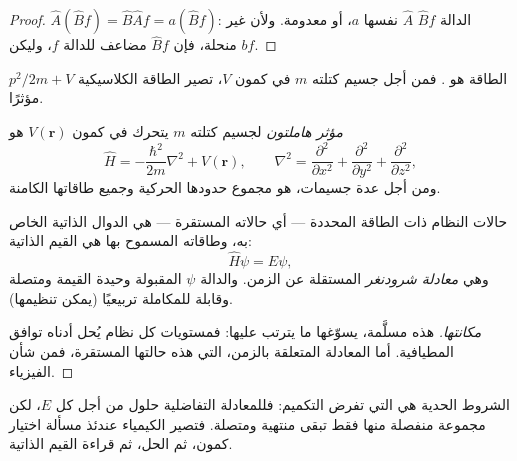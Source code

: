 \begin{proof}
$\hat A(\hat Bf) = \hat B\hat Af = a(\hat Bf)$: الدالة $\hat Bf$
  $\hat A$  نفسها $a$، أو معدومة. ولأن
 غير منحلة، فإن $\hat Bf$ مضاعف للدالة $f$، وليكن $bf$.
\end{proof}

 الطاقة هو . فمن أجل جسيم كتلته $m$ في
كمون $V$، تصير الطاقة الكلاسيكية $p^2/2m + V$ مؤثرًا.

\begin{definition}\label{def:b3:quantum-model-systems:schrodinger}
\emph{مؤثر هاملتون} لجسيم
كتلته $m$ يتحرك في كمون $V(\mathbf r)$ هو
\[
\hat H = -\frac{\hbar^2}{2m}\nabla^2 + V(\mathbf r), \qquad \nabla^2 =
\frac{\partial^2}{\partial x^2} + \frac{\partial^2}{\partial y^2} +
\frac{\partial^2}{\partial z^2},
\]
ومن أجل عدة جسيمات، هو مجموع حدودها الحركية وجميع طاقاتها
الكامنة.
\end{definition}

\begin{theorem}\label{thm:b3:quantum-model-systems:schrodinger}
حالات النظام ذات الطاقة المحددة --- أي حالاته المستقرة --- هي
الدوال الذاتية  الخاص به، وطاقاته المسموح بها هي
القيم الذاتية:
\[
\hat H\psi = E\psi,
\]
وهي \emph{معادلة شرودنغر} المستقلة عن الزمن.
والدالة $\psi$ المقبولة وحيدة القيمة ومتصلة
وقابلة للمكاملة تربيعيًا (يمكن تنظيمها).
\end{theorem}
\begin{proof}[مكانتها]
هذه مسلَّمة، يسوّغها ما يترتب عليها: فمستويات كل
نظام يُحل أدناه توافق المطيافية. أما المعادلة المتعلقة بالزمن،
التي هذه حالتها المستقرة، فمن شأن الفيزياء.
\end{proof}

الشروط الحدية هي التي تفرض التكميم: فللمعادلة التفاضلية
حلول من أجل كل $E$، لكن مجموعة منفصلة منها فقط تبقى منتهية
ومتصلة. فتصير الكيمياء عندئذ مسألة اختيار كمون، ثم الحل،
ثم قراءة القيم الذاتية.

